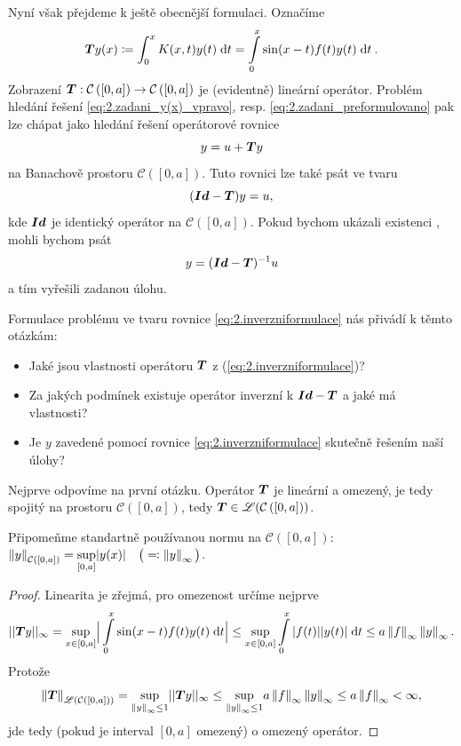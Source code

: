 Nyní však přejdeme k ještě obecnější formulaci. Označíme
\begin{equation}
     \boldsymbol{T} y(x)\coloneqq \int_0^x K(x,t)y(t)\;\mathrm{d}t=\int\limits_0^x \sin(x-t)f(t)y(t)\;\mathrm{d}t \:.
    \label{eq:2.obesnejsiformulaceTy}
\end{equation}
Zobrazení $ \boldsymbol{T} : \mathcal{C} \left( [0,a] \right) \rightarrow \mathcal{C}\left( [0,a] \right)$ je (evidentně) lineární operátor. Problém hledání řešení \eqref{eq:2.zadani_y(x)_vpravo}, resp. \eqref{eq:2.zadani_preformulovano} pak lze chápat jako hledání řešení operátorové rovnice
\begin{equation}
    y=u+ \boldsymbol{T} y
\end{equation}
na Banachově prostoru $\mathcal{C}([0,a])$. Tuto rovnici lze také psát ve tvaru
\begin{equation}
    (\boldsymbol{Id} - \boldsymbol{T} )y=u,
\end{equation}
kde $\boldsymbol{Id}$ je identický operátor na $\mathcal{C}([0,a])$. Pokud bychom ukázali existenci , mohli bychom psát
\begin{equation}
    y = (\boldsymbol{Id} - \boldsymbol{T} )^{-1}u
    \label{eq:2.inverzniformulace}
\end{equation}
a tím vyřešili zadanou úlohu.

Formulace problému ve tvaru rovnice \eqref{eq:2.inverzniformulace} nás přivádí k těmto otázkám:
\begin{itemize}
    \item Jaké jsou vlastnosti operátoru $ \boldsymbol{T} $ z (\ref{eq:2.inverzniformulace})?
    \item Za jakých podmínek existuje operátor inverzní k $\boldsymbol{Id} - \boldsymbol{T} $ a jaké má vlastnosti?
    \item Je $y$ zavedené pomocí rovnice \eqref{eq:2.inverzniformulace} skutečně řešením naší úlohy?
\end{itemize}
Nejprve odpovíme na první otázku. Operátor $ \boldsymbol{T} $ je lineární a omezený, je tedy spojitý na prostoru $\mathcal{C}([0,a])$, tedy $ \boldsymbol{T} \in \mathscr{L}(\mathcal{C}\left( [0,a]) \right)$.

Připomeňme standartně používanou normu na $\mathcal{C}([0,a])$: $\left\lVert y\right\rVert_{\mathcal{C}([0,a])} = \underset{[0,a]}{\sup} |y(x)| \quad \big(\eqqcolon \left\lVert y\right\rVert_\infty\big)$.

\begin{proof}
Linearita je zřejmá, pro omezenost určíme nejprve
\begin{equation}
    || \boldsymbol{T} y||_\infty = \underset{x\in[0,a]}{\sup}\Big|\int\limits_0^x\sin(x-t)f(t)y(t)\;\mathrm{d}t\Big|\leq \underset{x\in[0,a]}{\sup}\int\limits_0^x|f(t)||y(t)|\;\mathrm{d}t\leq a\left\lVert f\right\rVert_\infty\left\lVert y\right\rVert_\infty.
\end{equation}
Protože  
\begin{equation}
    \left\lVert\boldsymbol{T}\right\rVert_{\mathscr{L} \left( \mathcal{C}\left([0,a]\right) \right) } = \underset{\left\lVert y\right\rVert_\infty\leq1}{\sup}|| \boldsymbol{T} y||_\infty\leq \underset{\left\lVert y\right\rVert_\infty\leq1}{\sup} a \left\lVert f\right\rVert_\infty \left\lVert y\right\rVert_\infty\leq a \left\lVert f\right\rVert_\infty<\infty,
    \label{eq:omezeniOperatoru}
\end{equation}
jde tedy (pokud je interval $[0,a]$ omezený) o omezený operátor.
\end{proof}


